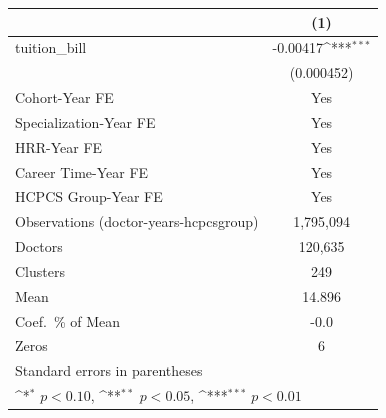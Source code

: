 {
\def\sym#1{\ifmmode^{#1}\else\(^{#1}\)\fi}
\begin{tabular}{l*{1}{c}}
\hline\hline
                    &\multicolumn{1}{c}{(1)}         \\
\hline
tuition\_bill        &    -0.00417\sym{***}\\
                    &  (0.000452)         \\
[1em]
Cohort-Year FE      &         Yes         \\
[1em]
Specialization-Year FE&         Yes         \\
[1em]
HRR-Year FE         &         Yes         \\
[1em]
Career Time-Year FE &         Yes         \\
[1em]
HCPCS Group-Year FE &         Yes         \\
\hline
Observations (doctor-years-hcpcsgroup)&   1,795,094         \\
Doctors             &     120,635         \\
Clusters            &         249         \\
Mean                &      14.896         \\
Coef.\ \% of Mean   &        -0.0         \\
Zeros               &           6         \\
\hline\hline
\multicolumn{2}{l}{\footnotesize Standard errors in parentheses}\\
\multicolumn{2}{l}{\footnotesize \sym{*} \(p<0.10\), \sym{**} \(p<0.05\), \sym{***} \(p<0.01\)}\\
\end{tabular}
}
